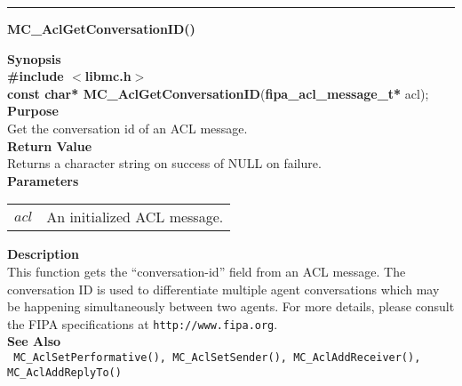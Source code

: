 \noindent
\vspace{5pt}
\rule{6.5in}{0.015in}
\noindent
{}
{\LARGE \bf MC\_AclGetConversationID()}\\
\label{api:MC_Acl_GetConversationID()}

\noindent
{\bf Synopsis}\\
{\bf \#include $<$libmc.h$>$}\\
{\bf const char* MC\_AclGetConversationID}({\bf fipa\_acl\_message\_t*} acl);\\

\noindent
{\bf Purpose}\\
Get the conversation id of an ACL message.\\

\noindent
{\bf Return Value}\\
Returns a character string on success of NULL on failure.\\

\noindent
{\bf Parameters}
\vspace{-0.1in}
\begin{description}
\item
\begin{tabular}{p{10 mm}p{145 mm}} 
$acl$ & An initialized ACL message. 
\end{tabular}
\end{description}

\noindent
{\bf Description}\\
This function gets the ``conversation-id'' field from an ACL message. 
The conversation ID is used to differentiate multiple agent conversations which
may be happening simultaneously between two agents. For more details, please
consult the FIPA specifications at \texttt{http://www.fipa.org}.\\

\noindent
{\bf See Also}\\
\texttt{
  MC\_AclSetPerformative(), MC\_AclSetSender(), MC\_AclAddReceiver(), 
    \linebreak MC\_AclAddReplyTo()
}

